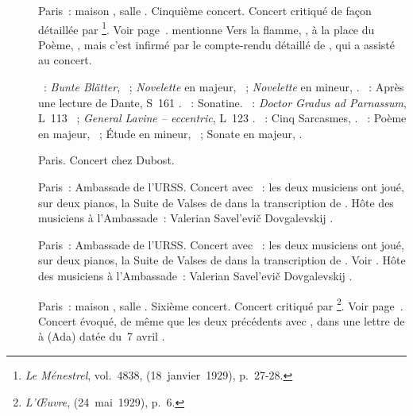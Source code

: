 \begin{description}
 \item[]
 Paris~: maison \Pleyel{}, salle \Chopin{}.
 Cinquième concert.
 Concert critiqué de façon détaillée par \citeauthor{Baruzi}%
 \footnote{\emph{Le Ménestrel}, vol.~4838,  (18~janvier~1929),
 p.~27-28.}.
 Voir page~\pageref{rec:Paris5}.
 \citet[p.~151]{Nekrasova08} mentionne Vers la flamme, , à la place
 du Poème,  , mais c'est infirmé par le compte-rendu
 détaillé de \citeauthor{Baruzi}, qui a assisté au concert.

 \textsc{\Schumann{}}~: \emph{Bunte Blätter}, ~; \emph{Novelette}
 en \kE majeur,  ~; \emph{Novelette} en \kF \Sharp
 mineur,  .
 \textsc{\Liszt{}}~: Après une lecture de Dante, S~161 .
 \textsc{\Ravel{}}~: Sonatine.
 \textsc{\Debussy{}}~: \emph{Doctor Gradus ad Parnassum}, L~113 ~;
 \emph{General Lavine -- eccentric}, L~123 .
 \textsc{\Prokofiev{}}~: Cinq Sarcasmes, .
 \textsc{\Scriabine{}}~: Poème en \kF \Sharp majeur,  ~;
 Étude en \kD \Sharp mineur,  ~; Sonate en \kF \Sharp
 majeur, .
 \item[]
 Paris.
 Concert chez Dubost.
 \item[]
 Paris~: Ambassade de l'\hbox{URSS}.
 Concert avec \SProkofiev{}~: les deux musiciens ont joué, sur deux pianos,
 la Suite de Valses de \Schubert{} dans la transcription de \Prokofiev{}.
 Hôte des musiciens à l'\hbox{Ambassade}~: Valerian Savel'evič Dovgalevskij
 \citep[voir][p.~36]{Sofronitsky82a}.
 \item[]
 Paris~: Ambassade de l'\hbox{URSS}.
 Concert avec \SProkofiev{}~: les deux musiciens ont joué, sur deux pianos,
 la Suite de Valses de \Schubert{} dans la transcription de \Prokofiev{}.
 Voir \citet[p.~359-360]{Prokofiev08}.
 Hôte des musiciens à l'\hbox{Ambassade}~: Valerian Savel'evič Dovgalevskij
 \citep[voir][p.~36]{Sofronitsky82a}.
 \item[]
 Paris~: maison \Pleyel{}, salle \Chopin{}.
 Sixième concert.
 Concert critiqué par \citeauthor{oeuvre1929-05-24}%
 \footnote{\emph{L'Œuvre},  (24~mai~1929), p.~6.}.
 Voir page~\pageref{rec:Paris6}.
 Concert évoqué, de même que les deux précédents avec \SProkofiev{}, dans
 une lettre de \VSofronitsky{} à \AVizel{} (Ada) datée du~7 avril
 \citep[voir][p.~151]{Nekrasova08}.


\end{description}
